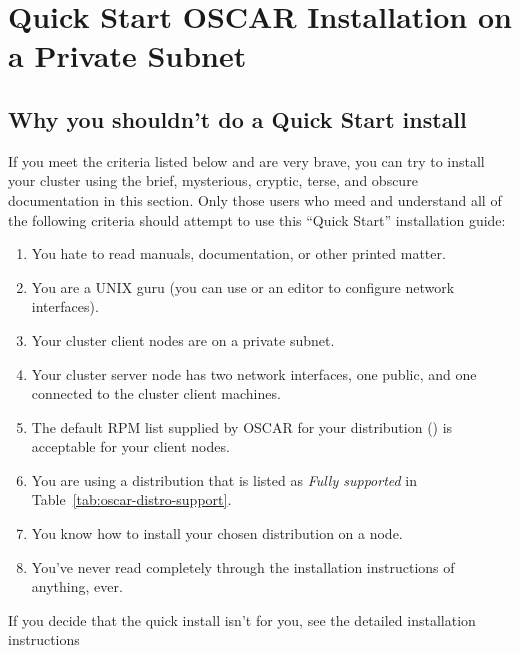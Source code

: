 %
%
%

\section{Quick Start OSCAR Installation on a Private Subnet}
\label{sec:quick-start}


\subsection{Why you shouldn't do a Quick Start install}

If you meet the criteria listed below and are very brave, you can try
to install your cluster using the brief, mysterious, cryptic, terse,
and obscure documentation in this section.  Only those users who meed
and understand all of the following criteria should attempt to use
this ``Quick Start'' installation guide:

\begin{enumerate}
\item You hate to read manuals, documentation, or other printed
  matter.
\item You are a UNIX guru (you can use  or an editor to
  configure network interfaces).
\item Your cluster client nodes are on a private subnet.
\item Your cluster server node has two network interfaces, one
  public, and one connected to the cluster client machines.
\item The default RPM list supplied by OSCAR for your distribution
  ()
  is acceptable for your client nodes.
\item You are using a distribution that is listed as \emph{Fully
    supported} in Table~\ref{tab:oscar-distro-support}.
\item You know how to install your chosen distribution on a node.
\item You've never read completely through the installation
  instructions of anything, ever.
\end{enumerate}

\docswitch{}{}

If you decide that the quick install isn't for you, see the detailed
installation instructions 

